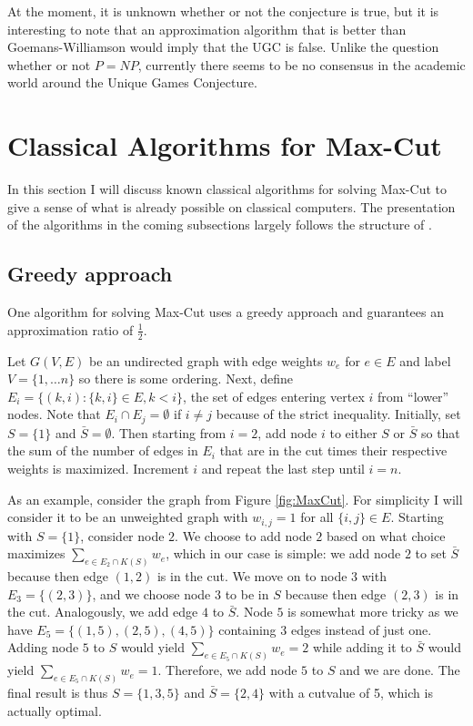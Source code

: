 At the moment, it is unknown whether or not the conjecture is true, but it is interesting to note that an approximation algorithm that is better than Goemans-Williamson would imply that the UGC is false. Unlike the question whether or not $P = NP$, currently there seems to be no consensus in the academic world around the Unique Games Conjecture.

\section{Classical Algorithms for Max-Cut}
In this section I will discuss known classical algorithms for solving Max-Cut to give a sense of what is already possible on classical computers. The presentation of the algorithms in the coming subsections largely follows the structure of \cite{lecture-MaxCut, lecture-GW}.
\subsection{Greedy approach}
One algorithm for solving Max-Cut uses a greedy approach and guarantees an approximation ratio of $\frac{1}{2}$. 

Let $G(V,E)$ be an undirected graph with edge weights $w_e$ for $e\in E$ and label $V = \{1, \dots n\}$ so there is some ordering. Next, define $E_i = \{(k,i) : \{k,i\} \in E, k < i\}$, the set of edges entering vertex $i$ from ``lower'' nodes. Note that $E_i \cap E_j = \emptyset$ if $i \neq j$ because of the strict inequality. Initially, set $S = \{1\}$ and $\bar{S} = \emptyset$.  Then starting from $i=2$, add node $i$ to either $S$ or $\bar{S}$ so that the sum of the number of edges in $E_i$ that are in the cut times their respective weights is maximized. Increment $i$ and repeat the last step until $i=n$.

As an example, consider the graph from Figure \ref{fig:MaxCut}. For simplicity I will consider it to be an unweighted graph with $w_{i,j} = 1$ for all $\{i,j\}\in E$. Starting with $S = \{1\}$, consider node $2$. We choose to add node $2$ based on what choice maximizes $\sum_{e \in E_2 \cap K(S)}w_e$, which in our case is simple: we add node $2$ to set $\bar{S}$ because then edge $(1,2)$ is in the cut. We move on to node $3$ with $E_3 = \{(2,3)\}$, and we choose node $3$ to be in $S$ because then edge $(2,3)$ is in the cut. Analogously, we add edge $4$ to $\bar{S}$. Node $5$ is somewhat more tricky as we have $E_5 = \{(1,5),(2,5),(4,5)\}$ containing 3 edges instead of just one. Adding node $5$ to $S$ would yield $\sum_{e \in E_5 \cap K(S)}w_e = 2$ while adding it to $\bar{S}$ would yield $\sum_{e \in E_5 \cap K(S)}w_e = 1$. Therefore, we add node $5$ to $S$ and we are done. The final result is thus $S = \{1,3,5\}$ and $\bar{S} = \{2,4\}$ with a cutvalue of 5, which is actually optimal.
\\

